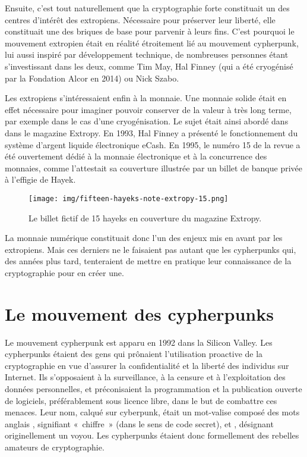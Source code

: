 Ensuite, c'est tout naturellement que la cryptographie forte constituait un des centres d'intérêt des extropiens. Nécessaire pour préserver leur liberté, elle constituait une des briques de base pour parvenir à leurs fins. C'est pourquoi le mouvement extropien était en réalité étroitement lié au mouvement cypherpunk, lui aussi inspiré par développement technique, de nombreuses personnes étant s'investissant dans les deux, comme Tim May, Hal Finney (qui a été cryogénisé par la Fondation Alcor en 2014) ou Nick Szabo.

Les extropiens s'intéressaient enfin à la monnaie. Une monnaie solide était en effet nécessaire pour imaginer pouvoir conserver de la valeur à très long terme, par exemple dans le cas d'une cryogénisation. Le sujet était ainsi abordé dans dans le magazine Extropy. En 1993, Hal Finney a présenté le fonctionnement du système d'argent liquide électronique eCash. En 1995, le numéro 15 de la revue a été ouvertement dédié à la monnaie électronique et à la concurrence des monnaies, comme l'attestait sa couverture illustrée par un billet de banque privée à l'effigie de Hayek.

\begin{figure}[h]
  \centering
  \texttt{[image: img/fifteen-hayeks-note-extropy-15.png]}
  \caption{Le billet fictif de 15 hayeks en couverture du magazine Extropy.}
\end{figure}

La monnaie numérique constituait donc l'un des enjeux mis en avant par les extropiens. Mais ces derniers ne le faisaient pas autant que les cypherpunks qui, des années plus tard, tenteraient de mettre en pratique leur connaissance de la cryptographie pour en créer une.

\section*{Le mouvement des cypherpunks}

Le mouvement cypherpunk est apparu en 1992 dans la Silicon Valley. Les cypherpunks étaient des gens qui prônaient l'utilisation proactive de la cryptographie en vue d'assurer la confidentialité et la liberté des individus sur Internet. Ils s'opposaient à la surveillance, à la censure et à l'exploitation des données personnelles, et préconisaient la programmation et la publication ouverte de logiciels, préférablement sous licence libre, dans le but de combattre ces menaces. Leur nom, calqué sur cyberpunk, était un mot-valise composé des mots anglais , signifiant «~chiffre~» (dans le sens de code secret), et , désignant originellement un voyou. Les cypherpunks étaient donc formellement des rebelles amateurs de cryptographie.

